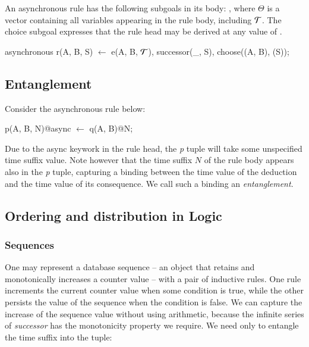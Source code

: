 An asynchronous rule has the following
subgoals in its body: , where
$\Theta$ is a vector containing all variables appearing in the rule body,
including $\Tau$.  The choice subgoal expresses that the rule head may be
derived at any value of .


\begin{Dedalus}
asynchronous
r(A, B, S) \(\leftarrow\)
   e(A, B, \(\Tau\)), successor(_, S), choose((A, B), (S));
\end{Dedalus}


\subsection{Entanglement}

Consider the asynchronous rule below:

\begin{Dedalus}
p(A, B, N)@async \(\leftarrow\)
  q(A, B)@N;
\end{Dedalus}

Due to the async keywork in the rule head, the \emph{p} tuple will take some unspecified time suffix value.
Note however that the time suffix $N$ of the rule body appears also in the \emph{p} tuple, capturing a 
binding between the time value of the deduction and the time value of its consequence.  We call such a binding
an \emph{entanglement}.   



\subsection{Ordering and distribution in Logic}

\subsubsection{Sequences}

One may represent a database sequence -- an object that retains and monotonically increases a counter value -- 
with a pair of inductive rules.  One rule increments the current counter value when some condition is 
true, while the other persists the value of the sequence when the condition is false.  We can capture the increase
of the sequence value without using arithmetic, because the infinite series of \emph{successor} has the monotonicity
property we require.  We need only to entangle the time suffix into the tuple:

